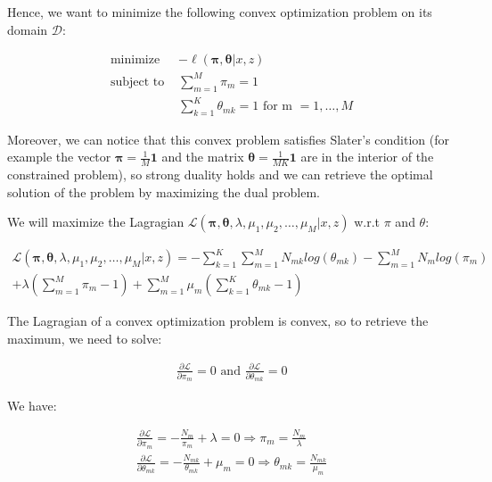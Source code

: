 \documentclass[11pt]{article}
\numberwithin{figure}{section} %
\begin{document}
Hence, we want to minimize the following convex optimization problem on its domain $\mathcal{D}$:


\begin{align}
 \text{minimize } & - \ell(\boldsymbol{\pi}, \boldsymbol{\theta}|x, z) \nonumber \\
 \text{subject to } & \sum\limits_{m=1}^M \pi_m = 1 \label{eqn:1}\\
& \sum\limits_{k=1}^K \theta_{mk} = 1 \text{ for m $=1,\hdots,M$}\label{eqn:2}
\end{align}


Moreover, we can notice that this convex problem satisfies Slater's condition (for example the vector $\boldsymbol{\pi} = \frac{1}{M}\boldsymbol{1}$ and the matrix $\boldsymbol{\theta} = \frac{1}{MK}\boldsymbol{1}$ are in the interior of the constrained problem), so strong duality holds and we can retrieve the optimal solution of the problem by maximizing the dual problem.

We will maximize the Lagragian $\mathcal{L}(\boldsymbol{\pi}, \boldsymbol{\theta}, \lambda, \mu_1, \mu_2, \hdots, \mu_M|x, z)$ w.r.t $\pi$ and $\theta$:

\begin{equation*}
\begin{aligned}
 \mathcal{L}(\boldsymbol{\pi}, \boldsymbol{\theta}, \lambda, \mu_1, \mu_2, \hdots, \mu_M|x, z) = - \sum\limits_{k=1}^K \sum\limits_{m=1}^M N_{mk} log(\theta_{mk})
- \sum\limits_{m=1}^M N_{m} log(\pi_m) \\
+ \lambda (\sum\limits_{m=1}^M \pi_m - 1) + \sum\limits_{m=1}^M \mu_m (\sum\limits_{k=1}^K \theta_{mk} - 1)
\end{aligned}
\end{equation*}

The Lagragian of a convex optimization problem is convex, so to retrieve the maximum, we need to solve:

\begin{equation*}
\begin{aligned}
\frac{\partial \mathcal{L}}{\partial \pi_m} = 0 \text{ \ and \ } \frac{\partial \mathcal{L}}{\partial \theta_{mk}} = 0
\end{aligned}
\end{equation*}

We have:

\begin{equation*}
\begin{aligned}
\frac{\partial \mathcal{L}}{\partial \pi_m} = - \frac{N_m}{\pi_m} + \lambda = 0 \Rightarrow \pi_m = \frac{N_m}{\lambda} \\
\frac{\partial \mathcal{L}}{\partial \theta_{mk}} = - \frac{N_{mk}}{\theta_{mk}} + \mu_m = 0 \Rightarrow \theta_{mk} = \frac{N_{mk}}{\mu_{m}}
\end{aligned}
\end{equation*}
\end{document}
